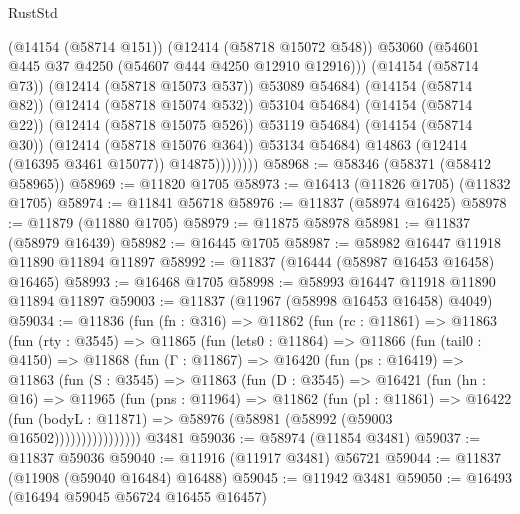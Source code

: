 \begin{lexlean}{RustStd}
\begin{coremodule}
                              (@14154 (@58714 @151))
                              (@12414 (@58718 @15072 @548))
                              @53060
                              (@54601 @445 @37 @4250 (@54607 @444 @4250 @12910 @12916)))
                            (@14154 (@58714 @73))
                            (@12414 (@58718 @15073 @537))
                            @53089
                            @54684)
                          (@14154 (@58714 @82))
                          (@12414 (@58718 @15074 @532))
                          @53104
                          @54684)
                        (@14154 (@58714 @22))
                        (@12414 (@58718 @15075 @526))
                        @53119
                        @54684)
                      (@14154 (@58714 @30))
                      (@12414 (@58718 @15076 @364))
                      @53134
                      @54684)
                    @14863
                    (@12414 (@16395 @3461 @15077))
                    @14875))))))))
@58968 := @58346 (@58371 (@58412 @58965))
@58969 := @11820 @1705
@58973 := @16413 (@11826 @1705) (@11832 @1705)
@58974 := @11841 @56718
@58976 := @11837 (@58974 @16425)
@58978 := @11879 (@11880 @1705)
@58979 := @11875 @58978
@58981 := @11837 (@58979 @16439)
@58982 := @16445 @1705
@58987 := @58982 @16447 @11918 @11890 @11894 @11897
@58992 := @11837 (@16444 (@58987 @16453 @16458) @16465)
@58993 := @16468 @1705
@58998 := @58993 @16447 @11918 @11890 @11894 @11897
@59003 := @11837 (@11967 (@58998 @16453 @16458) @4049)
@59034 := @11836
    (fun (fn : @316) =>
    @11862
      (fun (rc : @11861) =>
      @11863
        (fun (rty : @3545) =>
        @11865
          (fun (lets0 : @11864) =>
          @11866
            (fun (tail0 : @4150) =>
            @11868
              (fun (Γ : @11867) =>
              @16420
                (fun (ps : @16419) =>
                @11863
                  (fun (S : @3545) =>
                  @11863
                    (fun (D : @3545) =>
                    @16421
                      (fun (hn : @16) =>
                      @11965
                        (fun (pns : @11964) =>
                        @11862
                          (fun (pl : @11861) =>
                          @16422
                            (fun (bodyL : @11871) =>
                            @58976 (@58981 (@58992 (@59003 @16502))))))))))))))))
    @3481
@59036 := @58974 (@11854 @3481)
@59037 := @11837 @59036
@59040 := @11916 (@11917 @3481) @56721
@59044 := @11837 (@11908 (@59040 @16484) @16488)
@59045 := @11942 @3481
@59050 := @16493 (@16494 @59045 @56724 @16455 @16457)

\end{coremodule}
\end{lexlean}
